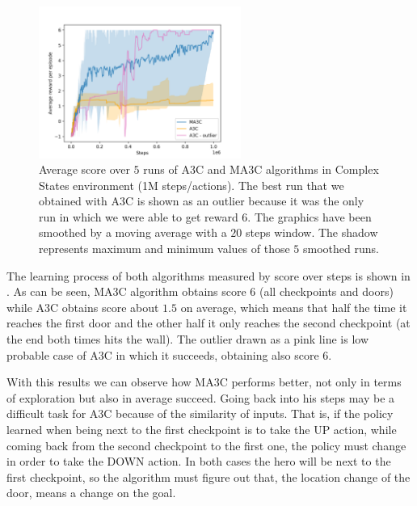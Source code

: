 \begin{figure}[hbtp]
\begin{center}
\includegraphics[width=250]{img/ComplexStates_performance.png}
\end{center}
\caption[Complex States performance]
{Average score over $5$ runs of \ac{A3C} and \ac{MA3C} algorithms in Complex States environment (1M steps/actions).
The best run that we obtained with \ac{A3C} is shown as an outlier because it was the only run in which we were able to get
reward $6$.
The graphics have been smoothed by a moving average with a $20$ steps window.
The shadow represents maximum and minimum values of those $5$ smoothed runs.}
\label{fig:ComplexStates_performance}
\end{figure}

The learning process of both algorithms measured by score over steps is shown in .
As can be seen, \ac{MA3C} algorithm obtains score $6$ (all checkpoints and doors) while \ac{A3C} obtains score about $1.5$ on average,
which means that half the time it reaches the first door and the other half it only reaches the second checkpoint
(at the end both times hits the wall).
The outlier drawn as a pink line is low probable case of \ac{A3C} in which it succeeds, obtaining also score $6$.

With this results we can observe how \ac{MA3C} performs better, not only in terms of exploration but also in average succeed.
Going back into his steps may be a difficult task for \ac{A3C} because of the similarity of inputs.
That is, if the policy learned when being next to the first checkpoint is to take the \textsc{UP} action, while coming back
from the second checkpoint to the first one, the policy must change in order to take the \textsc{DOWN} action.
In both cases the hero will be next to the first checkpoint, so the algorithm must figure out that, the location change
of the door, means a change on the goal.


